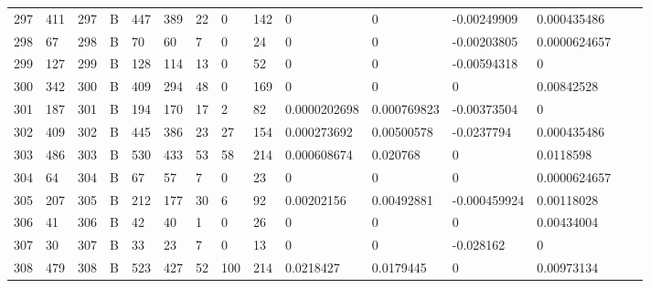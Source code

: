 \begin{longtable}{lllllllllllllll}
	297 & 411               & 297 & B   & 447               & 389               & 22                & 0    & 142        & 0              & 0              & -0.00249909   & 0.000435486  \\
	298 & 67                & 298 & B   & 70                & 60                & 7                 & 0    & 24         & 0              & 0              & -0.00203805   & 0.0000624657 \\
	299 & 127               & 299 & B   & 128               & 114               & 13                & 0    & 52         & 0              & 0              & -0.00594318   & 0            \\
	300 & 342               & 300 & B   & 409               & 294               & 48                & 0    & 169        & 0              & 0              & 0             & 0.00842528   \\
	301 & 187               & 301 & B   & 194               & 170               & 17                & 2    & 82         & 0.0000202698   & 0.000769823    & -0.00373504   & 0            \\
	302 & 409               & 302 & B   & 445               & 386               & 23                & 27   & 154        & 0.000273692    & 0.00500578     & -0.0237794    & 0.000435486  \\
	303 & 486               & 303 & B   & 530               & 433               & 53                & 58   & 214        & 0.000608674    & 0.020768       & 0             & 0.0118598    \\
	304 & 64                & 304 & B   & 67                & 57                & 7                 & 0    & 23         & 0              & 0              & 0             & 0.0000624657 \\
	305 & 207               & 305 & B   & 212               & 177               & 30                & 6    & 92         & 0.00202156     & 0.00492881     & -0.000459924  & 0.00118028   \\
	306 & 41                & 306 & B   & 42                & 40                & 1                 & 0    & 26         & 0              & 0              & 0             & 0.00434004   \\
	307 & 30                & 307 & B   & 33                & 23                & 7                 & 0    & 13         & 0              & 0              & -0.028162     & 0            \\
	308 & 479               & 308 & B   & 523               & 427               & 52                & 100  & 214        & 0.0218427      & 0.0179445      & 0             & 0.00973134   \\

\end{longtable}
